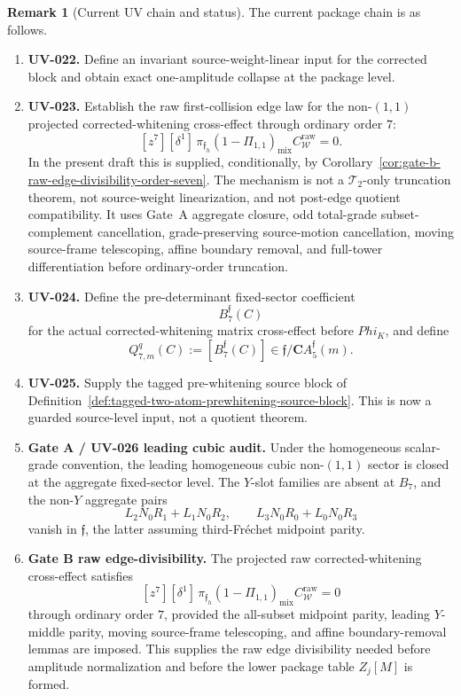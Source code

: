 \documentclass[11pt,a4paper]{amsart}
\def\Phi{Phi}%
\theoremstyle{plain}
\theoremstyle{definition}
\newtheorem{remark}[theorem]{Remark}
\begin{document}
\begin{remark}[Current UV chain and status]
\label{rem:current-uv-chain-and-status}
The current package chain is as follows.

\begin{enumerate}
\item \textbf{UV-022.} Define an invariant source-weight-linear input for the
corrected block and obtain exact one-amplitude collapse at the package level.

\item \textbf{UV-023.} Establish the raw first-collision edge law for the
non-\((1,1)\) projected corrected-whitening cross-effect through ordinary
order \(7\):
\[
[z^7][\delta^1]\,
\pi_{\mathfrak f_h}
(1-\Pi_{1,1})_{\mathrm{mix}}C_{\mathcal W}^{\mathrm{raw}}=0.
\]
In the present draft this is supplied, conditionally, by
Corollary~\ref{cor:gate-b-raw-edge-divisibility-order-seven}.  The
mechanism is not a \(\mathcal T_2\)-only truncation theorem, not
source-weight linearization, and not post-edge quotient compatibility.
It uses Gate~A aggregate closure, odd total-grade subset-complement
cancellation, grade-preserving source-motion cancellation, moving
source-frame telescoping, affine boundary removal, and full-tower
differentiation before ordinary-order truncation.

\item \textbf{UV-024.} Define the pre-determinant fixed-sector coefficient
\[
B_7^{\mathfrak f}(C)
\]
for the actual corrected-whitening matrix cross-effect before \(\Phi_K\), and
define
\[
Q_{7,m}^q(C):=[B_7^{\mathfrak f}(C)]
\in
\mathfrak f/\mathbf C A_5^{\mathfrak f}(m).
\]

\item \textbf{UV-025.} Supply the tagged pre-whitening source block of
Definition~\ref{def:tagged-two-atom-prewhitening-source-block}.  This is now
a guarded source-level input, not a quotient theorem.

\item \textbf{Gate A / UV-026 leading cubic audit.}
Under the homogeneous scalar-grade convention, the leading homogeneous
cubic non-\((1,1)\) sector is closed at the aggregate fixed-sector level.
The \(Y\)-slot families are absent at \(B_7\), and the non-\(Y\)
aggregate pairs
\[
L_2N_0R_1+L_1N_0R_2,
\qquad
L_3N_0R_0+L_0N_0R_3
\]
vanish in \(\mathfrak f\), the latter assuming third-Fr\'echet midpoint
parity.

\item \textbf{Gate B raw edge-divisibility.}
The projected raw corrected-whitening cross-effect satisfies
\[
[z^7][\delta^1]\,
\pi_{\mathfrak f_h}
(1-\Pi_{1,1})_{\mathrm{mix}}C_{\mathcal W}^{\mathrm{raw}}=0
\]
through ordinary order \(7\), provided the all-subset midpoint parity,
leading \(Y\)-middle parity, moving source-frame telescoping, and affine
boundary-removal lemmas are imposed.  This supplies the raw edge
divisibility needed before amplitude normalization and before the lower
package table \(Z_j[M]\) is formed.


\end{enumerate}
\end{remark}
\end{document}
